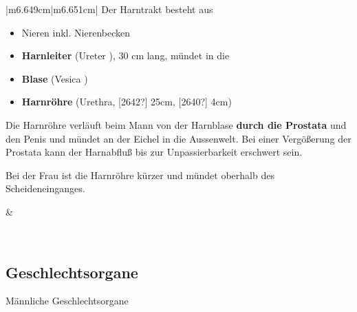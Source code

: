 \documentclass{article}
\makeatletter
\newcommand\gEs[1]{\textbf{\textcolor[rgb]{0.0,0.0,0.5019608}{#1}}}
\newcommand\gEs[1]{\textbf{\textcolor[rgb]{0.0,0.0,0.5019608}{#1}}}
\newcommand\gZ[1]{\textcolor[rgb]{0.5019608,0.5019608,0.5019608}{#1}}
\newcommand\captionof[1]{\def\@captype{#1}\caption}
\makeatother
\begin{document}
\begin{center}
\tablehead{}\begin{supertabular}{|m{6.649cm}|m{6.651cm}|}
\hline
{\mdseries Der Harntrakt besteht aus }

\begin{itemize}
\item {\mdseries Nieren inkl. Nierenbecken}

\item {\mdseries {}\gEs{Harnleiter} 
(Ureter ), 30 cm lang, m\"undet  in die}

\item {\mdseries {}\gEs{Blase} 
\gZ{(Vesica )}}

\item {\mdseries \gEs{Harnr\"ohre}  (Urethra, [2642?]
25cm, [2640?] 4cm)}

\end{itemize}
{\mdseries Die Harnr\"ohre verl\"auft beim Mann von der Harnblase
\gEs{durch die Prostata} und den Penis und m\"undet
an der Eichel in die Aussenwelt. Bei einer Verg\"o{\ss}erung der
Prostata kann der Harnabflu{\ss} bis zur Unpassierbarkeit erschwert
sein.  }

{\mdseries Bei der Frau ist die Harnr\"ohre k\"urzer und m\"undet
oberhalb des Scheideneinganges. }

 &
{%
 \par}

\captionof{figure}{Harntrakt mit Nieren (linke Niere im Querschnitt mit
Nierenbescken), Harnleiter, Blase und Harnr\"ohre. Auf den Nieren sieht
man wie eine Zipfelm\"utze die Nebennieren.}
\label{seq:refIllustration4}
\\\hline
\end{supertabular}
\end{center}
\subsection{Geschlechtsorgane}
{\mdseries\color[rgb]{0.0,0.0,0.5019608}
M\"annliche Geschlechtsorgane}
\end{document}
